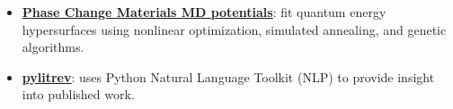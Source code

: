 \documentclass{article}
\begin{document}
\begin{itemize}[leftmargin=*]






\item \textbf{\href{https://github.com/jasonlarkin/pcm-potentials}{Phase Change Materials MD potentials}}: fit quantum energy hypersurfaces using nonlinear optimization, simulated annealing, and genetic algorithms. 

\item \textbf{\href{https://github.com/jasonlarkin/pylitrev}{pylitrev}}: uses Python Natural Language Toolkit (NLP) to provide insight into published work. 

\end{itemize}
\end{document}
